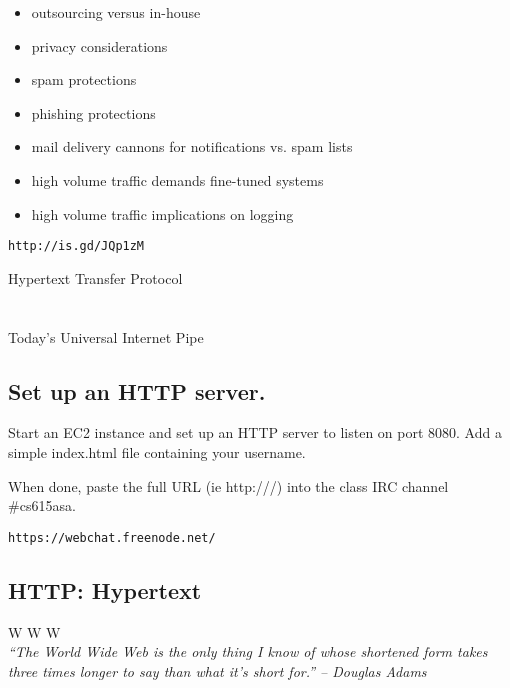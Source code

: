 \documentclass[xga]{xdvislides}
\begin{document}
\begin{itemize}
	\item outsourcing versus in-house
	\item privacy considerations
	\item spam protections
	\item phishing protections
	\item mail delivery cannons for notifications vs. spam lists
	\item high volume traffic demands fine-tuned systems
	\item high volume traffic implications on logging
\end{itemize}

{\tt http://is.gd/JQp1zM}

\newpage
\vspace*{\fill}
\begin{center}
	\Hugesize
		Hypertext Transfer Protocol\\ [1em]
	\hspace*{5mm}
	\blueline\\
	\hspace*{5mm}\\
		Today's Universal Internet Pipe
\end{center}
\vspace*{\fill}

\subsection{Set up an HTTP server.}

\vspace*{\fill}
Start an EC2 instance and set up an HTTP server to listen on port 8080.
Add a simple index.html file containing your username.

When done, paste the full URL (ie http:///) into the class IRC channel
\#cs615asa.

{\tt https://webchat.freenode.net/}
\vspace*{\fill}


\subsection{HTTP: Hypertext}
\vspace{.5in}
\begin{center}
	\Huge
	W W W
	\\
\vspace{.5in}
	{\em ``The World Wide Web is the only thing I know of whose shortened form
	takes three times longer to say than what it's short for.'' -- Douglas Adams}
\end{center}
\Normalsize
\end{document}
